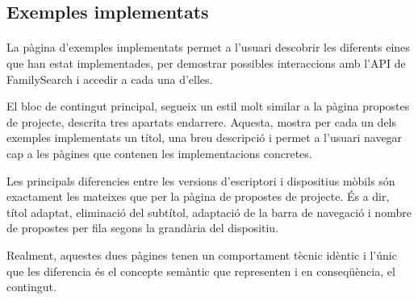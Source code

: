 \subsection{Exemples implementats}

    \paragraph{}
    La pàgina d'exemples implementats permet a l'usuari descobrir les diferents eines que han estat implementades, per demostrar possibles interaccions amb l’API de FamilySearch i accedir a cada una d'elles.

    El bloc de contingut principal, segueix un estil molt similar a la pàgina propostes de projecte, descrita tres apartats endarrere. Aquesta, mostra per cada un dels exemples implementats un títol, una breu descripció i permet a l'usuari navegar cap a les pàgines que contenen les implementacions concretes.

    Les principals diferencies entre les versions d'escriptori i dispositius mòbils són exactament les mateixes que per la pàgina de propostes de projecte. És a dir, títol adaptat, eliminació del subtítol, adaptació de la barra de navegació i nombre de propostes per fila segons la grandària del dispositiu.

    Realment, aquestes dues pàgines tenen un comportament tècnic idèntic i l'únic que les diferencia és el concepte semàntic que representen i en conseqüència, el contingut.
